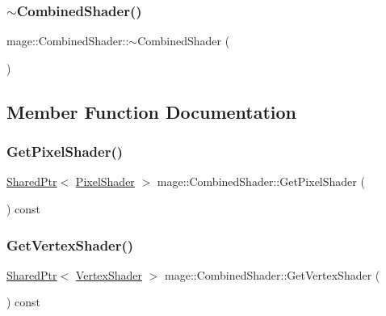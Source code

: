 \hypertarget{structmage_1_1_combined_shader_a6b1767d2525724f2f9120df87253973e}{}\label{structmage_1_1_combined_shader_a6b1767d2525724f2f9120df87253973e} 
\subsubsection{\texorpdfstring{$\sim$\+Combined\+Shader()}{~CombinedShader()}}
{\footnotesize\ttfamily mage\+::\+Combined\+Shader\+::$\sim$\+Combined\+Shader (\begin{DoxyParamCaption}{ }\end{DoxyParamCaption})\hspace{0.3cm}{\ttfamily [default]}}



\subsection{Member Function Documentation}
\hypertarget{structmage_1_1_combined_shader_a70b9d991d76c07aff7e6e83cc5f715b1}{}\label{structmage_1_1_combined_shader_a70b9d991d76c07aff7e6e83cc5f715b1} 
\subsubsection{\texorpdfstring{Get\+Pixel\+Shader()}{GetPixelShader()}}
{\footnotesize\ttfamily \hyperlink{namespacemage_a1e01ae66713838a7a67d30e44c67703e}{Shared\+Ptr}$<$ \hyperlink{classmage_1_1_pixel_shader}{Pixel\+Shader} $>$ mage\+::\+Combined\+Shader\+::\+Get\+Pixel\+Shader (\begin{DoxyParamCaption}{ }\end{DoxyParamCaption}) const}

\hypertarget{structmage_1_1_combined_shader_a57d05ca7f8982d4f078f5d7fef506fd8}{}\label{structmage_1_1_combined_shader_a57d05ca7f8982d4f078f5d7fef506fd8} 
\subsubsection{\texorpdfstring{Get\+Vertex\+Shader()}{GetVertexShader()}}
{\footnotesize\ttfamily \hyperlink{namespacemage_a1e01ae66713838a7a67d30e44c67703e}{Shared\+Ptr}$<$ \hyperlink{classmage_1_1_vertex_shader}{Vertex\+Shader} $>$ mage\+::\+Combined\+Shader\+::\+Get\+Vertex\+Shader (\begin{DoxyParamCaption}{ }\end{DoxyParamCaption}) const}


